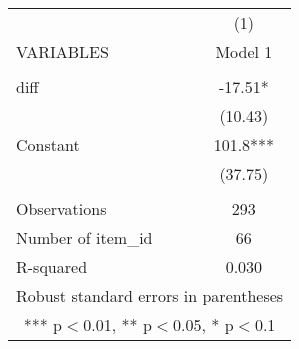 \documentclass[]{article}
\begin{document}
\begin{tabular}{lc} \hline
 & (1) \\
VARIABLES & Model 1 \\ \hline
 &  \\
diff & -17.51* \\
 & (10.43) \\
Constant & 101.8*** \\
 & (37.75) \\
 &  \\
Observations & 293 \\
Number of item\_id & 66 \\
 R-squared & 0.030 \\ \hline
\multicolumn{2}{c}{ Robust standard errors in parentheses} \\
\multicolumn{2}{c}{ *** p$<$0.01, ** p$<$0.05, * p$<$0.1} \\
\end{tabular}
\end{document}
